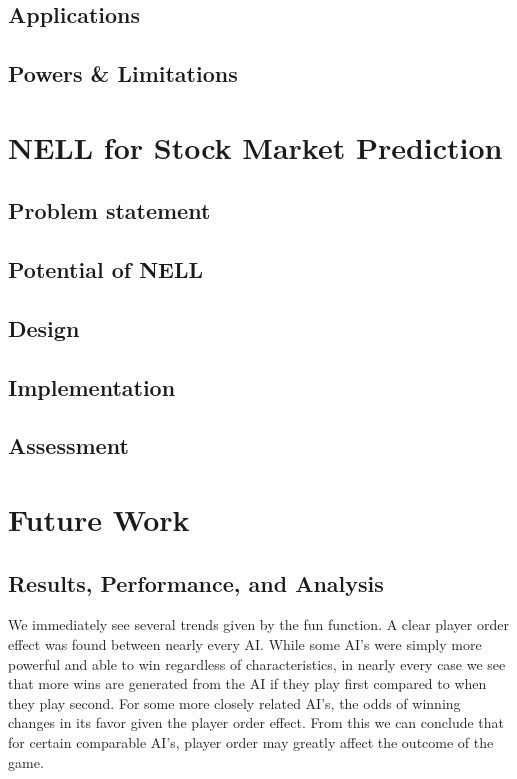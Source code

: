 \documentclass[12pt]{article}  %
\begin{document}
\subsection{Applications}
\subsection{Powers \& Limitations}



\section{NELL for Stock Market Prediction}

\subsection{Problem statement}
\subsection{Potential of NELL}
\subsection{Design}
\subsection{Implementation}
\subsection{Assessment}


\section{Future Work}






\subsection{Results, Performance, and Analysis }
We immediately see several trends given by the fun function. A clear player order effect was found between nearly every AI. While some AI’s were simply more powerful and able to win regardless of characteristics, in nearly every case we see that more wins are generated from the AI if they play first compared to when they play second. For some more closely related AI’s, the odds of winning changes in its favor given the player order effect. From this we can conclude that for certain comparable AI’s, player order may greatly affect the outcome of the game. 
\end{document}
